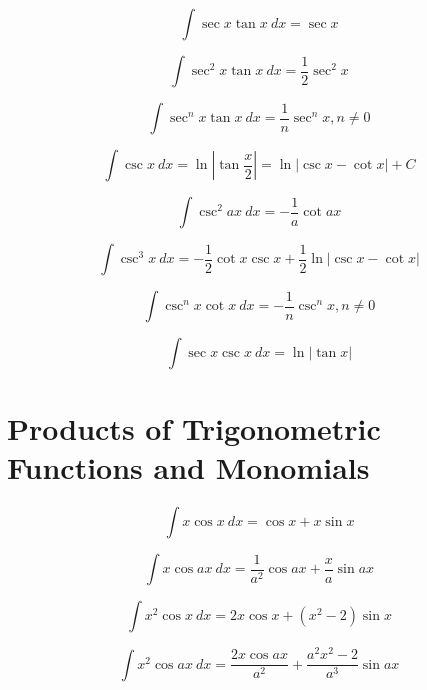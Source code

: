 \documentclass[12pt,letterpaper,leqno]{article}
\begin{document}
\begin{equation}
\int \sec x \tan x\ dx = \sec x 
\end{equation}

\begin{equation}
\int \sec^2 x \tan x\ dx = \frac{1}{2} \sec^2 x 
\end{equation}

\begin{equation}
\int \sec^n x \tan x \ dx = \frac{1}{n} \sec^n x , n\ne 0
\end{equation}

\begin{equation}
\int \csc x\ dx = \ln \left | \tan \frac{x}{2} \right|  = \ln | \csc x - \cot x| + C
\end{equation}

\begin{equation}
\int \csc^2 ax\ dx = -\frac{1}{a} \cot ax 
\end{equation}

\begin{equation}
\int \csc^3 x\ dx = -\frac{1}{2}\cot x \csc x + \frac{1}{2} \ln | \csc x - \cot x | 
\end{equation}

\begin{equation}
\int \csc^nx \cot x\ dx = -\frac{1}{n}\csc^n x, n\ne 0
\end{equation}

\begin{equation}
\int \sec x \csc x \ dx = \ln | \tan x | 
\end{equation}


\section*{Products of Trigonometric Functions and Monomials}

\begin{equation}
\int x \cos x \ dx = \cos x + x \sin x 
\end{equation}

\begin{equation}
\int x \cos ax \ dx = \frac{1}{a^2} \cos ax + \frac{x}{a} \sin ax 
\end{equation}

\begin{equation}
\int x^2 \cos x \ dx = 2 x \cos x + \left ( x^2 - 2 \right ) \sin x 
\end{equation}

\begin{equation}
\int x^2 \cos ax \ dx = \frac{2 x \cos ax }{a^2} + \frac{ a^2 x^2 - 2  }{a^3} \sin ax 
\end{equation}
\end{document}
